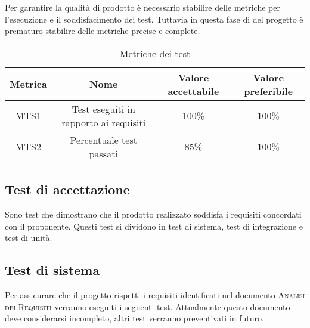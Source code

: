 \documentclass[../piano_di_qualifica.tex]{subfiles}
\begin{document}
Per garantire la qualità di prodotto è necessario stabilire delle metriche per l’esecuzione e il soddisfacimento dei test. Tuttavia in questa fase di del progetto è prematuro stabilire delle metriche precise e complete.


\begin{table}[!ht]
	\centering
	\begin{tabular}{|c|c|c|c|}
		\hline
		\rowcolor{lightgray}
		\textbf{Metrica} & \textbf{Nome}                          & \textbf{Valore accettabile} & \textbf{Valore preferibile} \\
		\hline
		MTS1             & Test eseguiti in rapporto ai requisiti & 100\%                       & 100\%                       \\
		\hline
		MTS2             & Percentuale test passati               & 85\%                        & 100\%                       \\
		\hline
	\end{tabular}
	\caption{Metriche dei test}
\end{table}

\subsection{Test di accettazione}%
\label{sub:test_accett}
Sono test che dimostrano che il prodotto realizzato soddisfa i requisiti concordati con il proponente.
Questi test si dividono in test di sistema, test di integrazione e test di unità.

\subsection{Test di sistema}%
\label{sub:test_sist}
Per assicurare che il progetto rispetti i requisiti identificati nel documento \textsc{Analisi dei Requisiti} verranno eseguiti i seguenti test. Attualmente questo documento deve considerarsi incompleto, altri test verranno preventivati in futuro. \par
\end{document}
